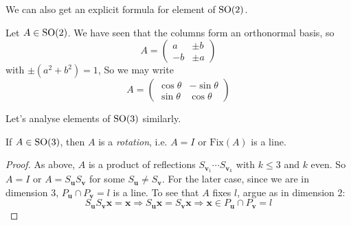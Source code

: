 \documentclass[10pt, a4paper, twoside]{report}
\begin{document}
We can also get an explicit formula for element of \(\operatorname{SO}(2)\). 
\begin{remark}
    Let \(A\in\operatorname{SO}(2)\). We have seen that the columns form an orthonormal basis, so 
    \[A=\begin{pmatrix}
        a & \pm b \\ -b & \pm a
    \end{pmatrix}\]
    with \(\pm(a^2+b^2)=1\), So we may write 
    \[A=\begin{pmatrix}
        \cos\theta & -\sin\theta \\ \sin\theta & \cos\theta
    \end{pmatrix}\]
\end{remark}
Let's analyse elements of \(\operatorname{SO}(3)\) similarly.
\begin{lemma}
    If \(A\in\operatorname{SO}(3)\), then \(A\) is a \emph{rotation}, i.e. \(A=I\) or \(\text{Fix}(A)\) is a line.
\end{lemma}
\begin{proof}
    As above, \(A\) is a product of reflections \(S_{\mathbf{v}_1}\cdots S_{\mathbf{v}_k}\) with \(k\leq 3\) and \(k\) even. So \(A=I\) or \(A=S_\mathbf{u}S_\mathbf{v}\) for some \(S_\mathbf{u}\neq S_\mathbf{v}\). For the later case, since we are in dimension 3, \(P_\mathbf{u}\cap P_\mathbf{v}=l\) is a line. To see that \(A\) fixes \(l\), argue as in dimension 2:
    \[S_\mathbf{u}S_\mathbf{v}\mathbf{x}=\mathbf{x}\Rightarrow S_\mathbf{u}\mathbf{x}=S_\mathbf{v}\mathbf{x}\Rightarrow\mathbf{x}\in P_\mathbf{u}\cap P_\mathbf{v}=l\]
\end{proof}
\end{document}
